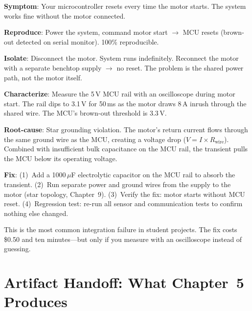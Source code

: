 \documentclass[11pt,letterpaper,twoside,openany]{book}
\begin{document}
\begin{keyconceptbox}
\textbf{Symptom}: Your microcontroller resets every time the motor starts. The system works fine without the motor connected.

\textbf{Reproduce}: Power the system, command motor start $\to$ MCU resets (brown-out detected on serial monitor). 100\% reproducible.

\textbf{Isolate}: Disconnect the motor. System runs indefinitely. Reconnect the motor with a separate benchtop supply $\to$ no reset. The problem is the shared power path, not the motor itself.

\textbf{Characterize}: Measure the 5\,V MCU rail with an oscilloscope during motor start. The rail dips to 3.1\,V for 50\,ms as the motor draws 8\,A inrush through the shared wire. The MCU's brown-out threshold is 3.3\,V.

\textbf{Root-cause}: Star grounding violation. The motor's return current flows through the same ground wire as the MCU, creating a voltage drop ($V = I \times R_{\text{wire}}$). Combined with insufficient bulk capacitance on the MCU rail, the transient pulls the MCU below its operating voltage.

\textbf{Fix}: (1)~Add a 1000\,$\mu$F electrolytic capacitor on the MCU rail to absorb the transient. (2)~Run separate power and ground wires from the supply to the motor (star topology, Chapter~9). (3)~Verify the fix: motor starts without MCU reset. (4)~Regression test: re-run all sensor and communication tests to confirm nothing else changed.

This is the most common integration failure in student projects. The fix costs \$0.50 and ten minutes---but only if you measure with an oscilloscope instead of guessing.
\end{keyconceptbox}

\FloatBarrier
\section{Artifact Handoff: What Chapter~5 Produces}
\end{document}
